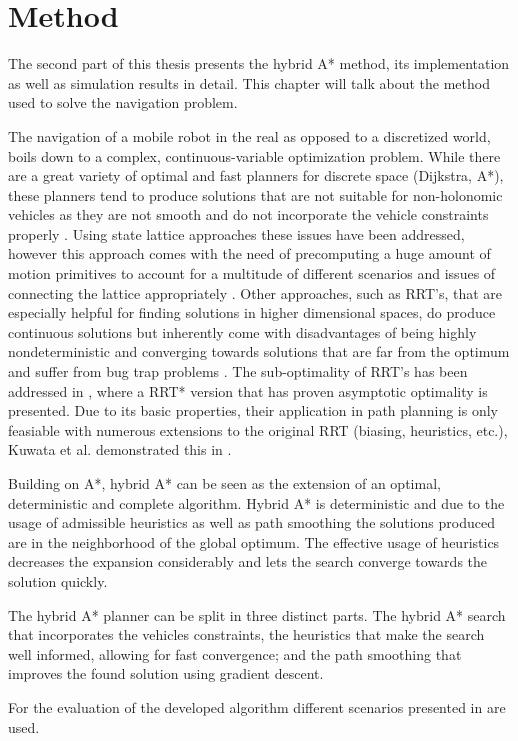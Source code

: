 \chapter{Method}
The second part of this thesis presents the hybrid A* method, its implementation as well as simulation results in detail. This chapter will talk about the method used to solve the navigation problem.

The navigation of a mobile robot in the real as opposed to a discretized world, boils down to a complex, continuous-variable optimization problem. While there are a great variety of optimal and fast planners for discrete space (Dijkstra, A*), these planners tend to produce solutions that are not suitable for non-holonomic vehicles as they are not smooth and do not incorporate the vehicle constraints properly \cite{Dolgov.2008}. Using state lattice approaches these issues have been addressed, however this approach comes with the need of precomputing a huge amount of motion primitives to account for a multitude of different scenarios and issues of connecting the lattice appropriately \cite{Urmson.2008,Ferguson.2008b,Ferguson.2008}.
Other approaches, such as RRT's, that are especially helpful for finding solutions in higher dimensional spaces, do produce continuous solutions but inherently come with disadvantages of being highly nondeterministic and converging towards solutions that are far from the optimum and suffer from bug trap problems \cite{Karaman.2011}. The sub-optimality of RRT's has been addressed in \cite{Karaman.2011}, where a RRT* version that has proven asymptotic optimality is presented. Due to its basic properties, their application in path planning is only feasiable with numerous extensions to the original RRT (biasing, heuristics, etc.), Kuwata et al. demonstrated this in \cite{Kuwata.2008}.

Building on A*, hybrid A* can be seen as the extension of an optimal, deterministic and complete algorithm. Hybrid A* is deterministic and due to the usage of admissible heuristics as well as path smoothing the solutions produced are in the neighborhood of the global optimum. The effective usage of heuristics decreases the expansion considerably and lets the search converge towards the solution quickly.

The hybrid A* planner can be split in three distinct parts. The hybrid A* search that incorporates the vehicles constraints, the heuristics that make the search well informed, allowing for fast convergence; and the path smoothing that improves the found solution using gradient descent.

For the evaluation of the developed algorithm different scenarios presented in  are used.



